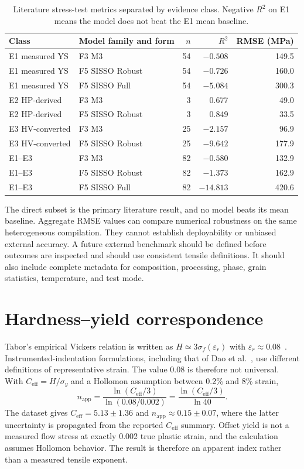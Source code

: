 \documentclass[a4paper,11pt]{article}
\begin{document}
\begin{table}[H]
\centering
\caption{Literature stress-test metrics separated by evidence class. Negative $R^2$ on E1 means the model does not beat the E1 mean baseline.}
\label{tab:external}
\small
\begin{tabular}{llrrr}
\toprule
Class & Model family and form & $n$ & $R^2$ & RMSE (MPa) \\
\midrule
E1 measured YS & F3 M3 & 54 & $-0.508$ & 149.5 \\
E1 measured YS & F5 SISSO Robust & 54 & $-0.726$ & 160.0 \\
E1 measured YS & F5 SISSO Full & 54 & $-5.084$ & 300.3 \\
E2 HP-derived & F3 M3 & 3 & 0.677 & 49.0 \\
E2 HP-derived & F5 SISSO Robust & 3 & 0.849 & 33.5 \\
E3 HV-converted & F3 M3 & 25 & $-2.157$ & 96.9 \\
E3 HV-converted & F5 SISSO Robust & 25 & $-9.642$ & 177.9 \\
\midrule
E1--E3 & F3 M3 & 82 & $-0.580$ & 132.9 \\
E1--E3 & F5 SISSO Robust & 82 & $-1.373$ & 162.9 \\
E1--E3 & F5 SISSO Full & 82 & $-14.813$ & 420.6 \\
\bottomrule
\end{tabular}
\end{table}

The direct subset is the primary literature result, and no model beats its mean baseline. Aggregate RMSE values can compare numerical robustness on the same heterogeneous compilation. They cannot establish deployability or unbiased external accuracy. A future external benchmark should be defined before outcomes are inspected and should use consistent tensile definitions. It should also include complete metadata for composition, processing, phase, grain statistics, temperature, and test mode.

\section{Hardness--yield correspondence}
\label{si:tabor}

Tabor's empirical Vickers relation is written as $H\simeq3\sigma_f(\varepsilon_r)$ with $\varepsilon_r\approx0.08$~\cite{Tabor1951}. Instrumented-indentation formulations, including that of Dao et al.~\cite{Dao2001}, use different definitions of representative strain. The value 0.08 is therefore not universal. With $C_{\mathrm{eff}}=H/\sigma_y$ and a Hollomon assumption between 0.2\% and 8\% strain,
\begin{equation}
n_{\mathrm{app}}=\frac{\ln(C_{\mathrm{eff}}/3)}{\ln(0.08/0.002)}
=\frac{\ln(C_{\mathrm{eff}}/3)}{\ln 40}.
\end{equation}
The dataset gives $C_{\mathrm{eff}}=5.13\pm1.36$ and $n_{\mathrm{app}}\approx0.15\pm0.07$, where the latter uncertainty is propagated from the reported $C_{\mathrm{eff}}$ summary. Offset yield is not a measured flow stress at exactly 0.002 true plastic strain, and the calculation assumes Hollomon behavior. The result is therefore an apparent index rather than a measured tensile exponent.
\end{document}
